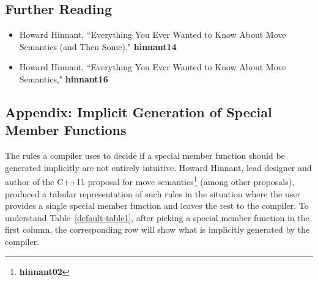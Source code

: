 {\subsection[Further Reading]{Further Reading}\label{further-reading}

\begin{itemize}
\item{Howard Hinnant, ``Everything You Ever Wanted to Know About Move Semantics (and Then Some)," \textbf{hinnant14}}
\item{Howard Hinnant, ``Everything You Ever Wanted to Know About Move Semantics," \textbf{hinnant16}}
\end{itemize}

\subsection[Appendix: Implicit Generation of Special Member Functions]{Appendix: Implicit Generation of Special Member Functions}\label{appendix:-implicit-generation-of-special-member-functions}

The rules a compiler uses to decide if a special member function
should be generated implicitly are not entirely intuitive. Howard
Hinnant, lead designer and author of the C++11 proposal for move
semantics\footnote{\textbf{hinnant02}} (among other proposals), produced a tabular representation of
such rules in the situation where the user provides a single special
member function and leaves the rest to the compiler. To understand Table~\ref{default-table1}, after picking a special member function in the first
column, the corresponding row will show what is implicitly generated by
the compiler.

}
